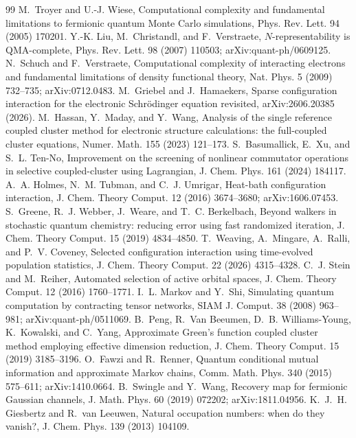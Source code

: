 \documentclass[11pt]{article}
\theoremstyle{definition}
\begin{document}
\begin{thebibliography}{99}
 M.~Troyer and U.-J. Wiese, Computational complexity and fundamental limitations to fermionic quantum Monte Carlo simulations, Phys. Rev. Lett. 94 (2005) 170201.
 Y.-K. Liu, M.~Christandl, and F.~Verstraete, $N$-representability is QMA-complete, Phys. Rev. Lett. 98 (2007) 110503; arXiv:quant-ph/0609125.
 N.~Schuch and F.~Verstraete, Computational complexity of interacting electrons and fundamental limitations of density functional theory, Nat. Phys. 5 (2009) 732--735; arXiv:0712.0483.
 M.~Griebel and J.~Hamaekers, Sparse configuration interaction for the electronic Schr\"odinger equation revisited, arXiv:2606.20385 (2026).
 M.~Hassan, Y.~Maday, and Y.~Wang, Analysis of the single reference coupled cluster method for electronic structure calculations: the full-coupled cluster equations, Numer. Math. 155 (2023) 121--173.
 S.~Basumallick, E.~Xu, and S.~L. Ten-No, Improvement on the screening of nonlinear commutator operations in selective coupled-cluster using Lagrangian, J. Chem. Phys. 161 (2024) 184117.
 A.~A. Holmes, N.~M. Tubman, and C.~J. Umrigar, Heat-bath configuration interaction, J. Chem. Theory Comput. 12 (2016) 3674--3680; arXiv:1606.07453.
 S.~Greene, R.~J. Webber, J.~Weare, and T.~C. Berkelbach, Beyond walkers in stochastic quantum chemistry: reducing error using fast randomized iteration, J. Chem. Theory Comput. 15 (2019) 4834--4850.
 T.~Weaving, A.~Mingare, A.~Ralli, and P.~V. Coveney, Selected configuration interaction using time-evolved population statistics, J. Chem. Theory Comput. 22 (2026) 4315--4328.
 C.~J. Stein and M.~Reiher, Automated selection of active orbital spaces, J. Chem. Theory Comput. 12 (2016) 1760--1771.
 I.~L. Markov and Y.~Shi, Simulating quantum computation by contracting tensor networks, SIAM J. Comput. 38 (2008) 963--981; arXiv:quant-ph/0511069.
 B.~Peng, R.~Van Beeumen, D.~B. Williams-Young, K.~Kowalski, and C.~Yang, Approximate Green's function coupled cluster method employing effective dimension reduction, J. Chem. Theory Comput. 15 (2019) 3185--3196.
 O.~Fawzi and R.~Renner, Quantum conditional mutual information and approximate Markov chains, Comm. Math. Phys. 340 (2015) 575--611; arXiv:1410.0664.
 B.~Swingle and Y.~Wang, Recovery map for fermionic Gaussian channels, J. Math. Phys. 60 (2019) 072202; arXiv:1811.04956.
 K.~J.~H. Giesbertz and R.~van Leeuwen, Natural occupation numbers: when do they vanish?, J. Chem. Phys. 139 (2013) 104109.

\end{thebibliography}
\end{document}
